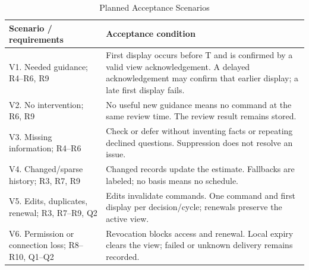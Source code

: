 \documentclass[conference,letterpaper]{IEEEtran}
\begin{document}
\begin{table}[!t]
\caption{Planned Acceptance Scenarios}\label{tab:acceptance}
\centering\footnotesize
\renewcommand{\arraystretch}{1.12}\setlength{\tabcolsep}{3pt}
\begin{tabularx}{\columnwidth}{@{}>{\raggedright\arraybackslash}X>{\raggedright\arraybackslash}X@{}}\toprule
\textbf{Scenario / requirements} & \textbf{Acceptance condition}\\\midrule
V1. Needed guidance; R4--R6, R9 & First display occurs before T and is confirmed by a valid view acknowledgement. A delayed acknowledgement may confirm that earlier display; a late first display fails.\\
V2. No intervention; R6, R9 & No useful new guidance means no command at the same review time. The review result remains stored.\\
V3. Missing information; R4--R6 & Check or defer without inventing facts or repeating declined questions. Suppression does not resolve an issue.\\
V4. Changed/sparse history; R3, R7, R9 & Changed records update the estimate. Fallbacks are labeled; no basis means no schedule.\\
V5. Edits, duplicates, renewal; R3, R7--R9, Q2 & Edits invalidate commands. One command and first display per decision/cycle; renewals preserve the active view.\\
V6. Permission or connection loss; R8--R10, Q1--Q2 & Revocation blocks access and renewal. Local expiry clears the view; failed or unknown delivery remains recorded.\\
\bottomrule
\end{tabularx}
\end{table}
\end{document}
